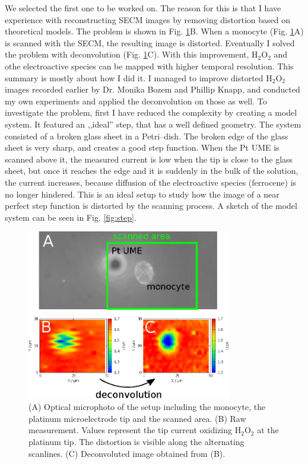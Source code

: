 \documentclass[a4paper, 11pt, oneside, bibliography=totoc]{article}
\begin{document}
We selected the first one to be worked on. The reason for this is that I have experience with reconstructing SECM images by removing distortion based on theoretical models. The problem is shown in Fig. \ref{fig:deconv}B. When a monocyte (Fig. \ref{fig:deconv}A) is scanned with the SECM, the resulting image is distorted. Eventually I solved the problem with deconvolution (Fig. \ref{fig:deconv}C). With this improvement, H$_2$O$_2$ and othe electroactive species can be mapped with higher temporal resolution. This summary is mostly about how I did it. I managed to improve distorted H$_2$O$_2$ images recorded earlier by Dr. Monika Bozem and Phillip Knapp, and conducted my own experiments and applied the deconvolution on those as well. To investigate the problem, first I have reduced the complexity by creating a model system. It featured an ,,ideal'' step, that has a well defined geometry. The system consisted of a broken glass sheet in a Petri--dish. The broken edge of the glass sheet is very sharp, and creates a good step function. When the Pt UME is scanned above it, the measured current is low when the tip is close to the glass sheet, but once it reaches the edge and it is suddenly in the bulk of the solution, the current increases, because diffusion of the electroactive species (ferrocene) is no longer hindered. This is an ideal setup to study how the image of a near perfect step function is distorted by the scanning process. A sketch of the model system can be seen in Fig. \ref{fig:step}.

\begin{figure}
\centering
\includegraphics[width=0.8\textwidth]{deconv.eps}
\caption{(A) Optical microphoto of the setup including the monocyte, the platinum microelectrode tip and the scanned area. (B) Raw measurement. Values represent the tip current oxidizing H$_2$O$_2$ at the platinum tip. The distortion is visible along the alternating scanlines. (C) Deconvoluted image obtained from (B).}
\label{fig:deconv}
\end{figure} 
\end{document}
